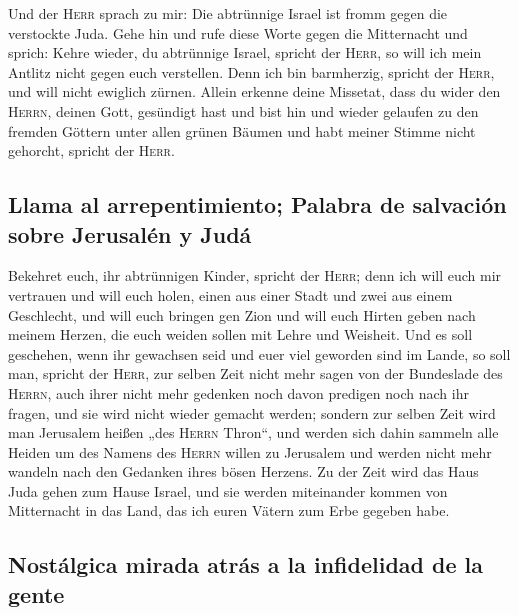  Und der \textsc{Herr} sprach zu mir: Die abtrünnige
Israel ist fromm gegen die verstockte Juda.  Gehe hin und
rufe diese Worte gegen die Mitternacht und sprich: Kehre wieder, du
abtrünnige Israel, spricht der \textsc{Herr}, so will ich mein Antlitz
nicht gegen euch verstellen. Denn ich bin barmherzig, spricht der
\textsc{Herr}, und will nicht ewiglich zürnen.  Allein
erkenne deine Missetat, dass du wider den \textsc{Herrn}, deinen Gott,
gesündigt hast und bist hin und wieder gelaufen zu den fremden Göttern
unter allen grünen Bäumen und habt meiner Stimme nicht gehorcht, spricht
der \textsc{Herr}.

\hypertarget{llama-al-arrepentimiento-palabra-de-salvaciuxf3n-sobre-jerusaluxe9n-y-juduxe1}{%
\subsection{Llama al arrepentimiento; Palabra de salvación sobre
Jerusalén y
Judá}\label{llama-al-arrepentimiento-palabra-de-salvaciuxf3n-sobre-jerusaluxe9n-y-juduxe1}}

 Bekehret euch, ihr abtrünnigen Kinder, spricht der
\textsc{Herr}; denn ich will euch mir vertrauen und will euch holen,
einen aus einer Stadt und zwei aus einem Geschlecht, und will euch
bringen gen Zion  und will euch Hirten geben nach meinem
Herzen, die euch weiden sollen mit Lehre und Weisheit. 
Und es soll geschehen, wenn ihr gewachsen seid und euer viel geworden
sind im Lande, so soll man, spricht der \textsc{Herr}, zur selben Zeit
nicht mehr sagen von der Bundeslade des \textsc{Herrn}, auch ihrer nicht
mehr gedenken noch davon predigen noch nach ihr fragen, und sie wird
nicht wieder gemacht werden;  sondern zur selben Zeit
wird man Jerusalem heißen „des \textsc{Herrn} Thron``, und werden sich
dahin sammeln alle Heiden um des Namens des \textsc{Herrn} willen zu
Jerusalem und werden nicht mehr wandeln nach den Gedanken ihres bösen
Herzens.  Zu der Zeit wird das Haus Juda gehen zum Hause
Israel, und sie werden miteinander kommen von Mitternacht in das Land,
das ich euren Vätern zum Erbe gegeben habe.

\hypertarget{nostuxe1lgica-mirada-atruxe1s-a-la-infidelidad-de-la-gente}{%
\subsection{Nostálgica mirada atrás a la infidelidad de la
gente}\label{nostuxe1lgica-mirada-atruxe1s-a-la-infidelidad-de-la-gente}}

